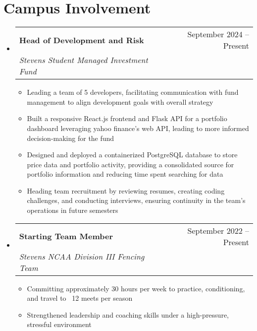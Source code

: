 \documentclass[letterpaper,11pt]{article}
\makeatletter
\newcommand{\resumeItem}[1]{
  \item\small{
    {#1 \vspace{-2pt}}
  }
}
\newcommand{\resumeSubheading}[4]{
  \vspace{-2pt}\item
    \begin{tabular*}{0.97\textwidth}[t]{l@{\extracolsep{\fill}}r}
      \textbf{#1} & #2 \\
      \textit{\small#3} & \textit{\small #4} \\
    \end{tabular*}\vspace{-7pt}
}
\newcommand{\resumeSubSubheading}[2]{
    \item
    \begin{tabular*}{0.97\textwidth}{l@{\extracolsep{\fill}}r}
      \textit{\small#1} & \textit{\small #2} \\
    \end{tabular*}\vspace{-7pt}
}
\newcommand{\resumeSubHeadingListStart}{\begin{itemize}[leftmargin=0.15in, label={}]}
\newcommand{\resumeSubHeadingListEnd}{\end{itemize}}
\newcommand{\resumeItemListStart}{\begin{itemize}}
\newcommand{\resumeItemListEnd}{\end{itemize}\vspace{-5pt}}
\makeatother
\begin{document}

\section{Campus Involvement}
  \resumeSubHeadingListStart

    \resumeSubheading{Head of Development and Risk}{September 2024 -- Present}{Stevens Student Managed Investment Fund}{\empty}
    \resumeItemListStart
      \resumeItem{Leading a team of 5 developers, facilitating communication with fund management to align development goals with overall strategy}
      \resumeItem{Built a responsive React.js frontend and Flask API for a portfolio dashboard leveraging yahoo finance’s web API, leading to more informed decision-making for the fund}
      \resumeItem{Designed and deployed a containerized PostgreSQL database to store price data and portfolio activity, providing a consolidated source for portfolio information and reducing time spent searching for data}
      \resumeItem{Heading team recruitment by reviewing resumes, creating coding challenges, and conducting interviews, ensuring continuity in the team’s operations in future semesters}
    \resumeItemListEnd
    \resumeSubheading{Starting Team Member}{September 2022 -- Present}{Stevens NCAA Division III Fencing Team}{\empty}
    \resumeItemListStart
      \resumeItem{Committing approximately 30 hours per week to practice, conditioning, and travel to ~12 meets per season}
      \resumeItem{Strengthened leadership and coaching skills under a high-pressure, stressful environment}
    \resumeItemListEnd
  \resumeSubHeadingListEnd

\end{document}
